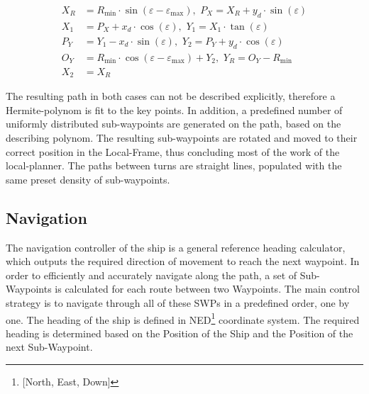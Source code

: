 \documentclass{ifacconf}
\begin{document}
\begin{align}
X_R &= R_\text{min} \cdot \sin(\varepsilon - \varepsilon _\text{max}),\,\, P_X = X_R + y_d \cdot \sin(\varepsilon)\\
X_1 &= P_X + x_d \cdot \cos(\varepsilon),\,\, Y_1 = X_1 \cdot \tan(\varepsilon)\\
P_Y &= Y_1 - x_d \cdot \sin(\varepsilon),\,\, Y_2 = P_Y + y_d \cdot \cos(\varepsilon)\\
O_Y &= R_\text{min} \cdot \cos(\varepsilon - \varepsilon _\text{max}) + Y_2,\,\, Y_R = O_Y - R_\text{min}\\
X_2 &= X_R
\end{align}

The resulting path in both cases can not be described explicitly, therefore a Hermite-polynom is fit to the key points. In addition, a predefined number of uniformly distributed sub-waypoints are generated on the path, based on the describing polynom. The resulting sub-waypoints are rotated and moved to their correct position in the Local-Frame, thus concluding most of the work of the local-planner. The paths between turns are straight lines, populated with the same preset density of sub-waypoints.

\subsection{Navigation}

The navigation controller of the ship is a general reference heading calculator, which outputs the required direction of movement to reach the next waypoint. In order to efficiently and accurately navigate along the path, a set of Sub-Waypoints is calculated for each route between two Waypoints. The main control strategy is to navigate through all of these SWPs in a predefined order, one by one. The heading of the ship is defined in NED\footnote[1]{[North, East, Down]} coordinate system. The required heading is determined based on the Position of the Ship and the Position of the next Sub-Waypoint.
\end{document}
